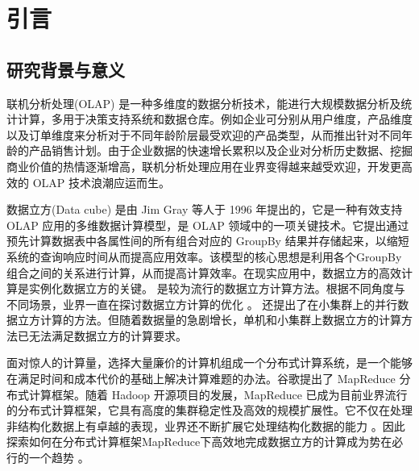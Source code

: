 \chapter{引言}

\section{研究背景与意义}
联机分析处理(OLAP) \cite{chaudhuri1997overview} 是一种多维度的数据分析技术，能进行大规模数据分析及统计计算，多用于决策支持系统和数据仓库。例如企业可分别从用户维度，产品维度以及订单维度来分析对于不同年龄阶层最受欢迎的产品类型，从而推出针对不同年龄的产品销售计划。由于企业数据的快速增长累积以及企业对分析历史数据、挖掘商业价值的热情逐渐增高，联机分析处理应用在业界变得越来越受欢迎，开发更高效的 OLAP 技术浪潮应运而生。

数据立方(Data cube) \cite{gray1997data}是由 Jim Gray 等人于 1996 年提出的，它是一种有效支持 OLAP 应用的多维数据计算模型，是 OLAP 领域中的一项关键技术。它提出通过预先计算数据表中各属性间的所有组合对应的 GroupBy 结果并存储起来，以缩短系统的查询响应时间从而提高应用效率。该模型的核心思想是利用各个GroupBy组合之间的关系进行计算，从而提高计算效率。在现实应用中，数据立方的高效计算是实例化数据立方的关键。 \cite{agarwal1996computation} \cite{beyer1999bottom} 是较为流行的数据立方计算方法。根据不同角度与不同场景，业界一直在探讨数据立方计算的优化 \cite{xin2003star} \cite{harinarayan1996implementing} \cite{zhao1997array} \cite{han2001efficient} \cite{wang2002condensed}。\cite{ng2001iceberg} \cite{dehne2002parallelizing} 还提出了在小集群上的并行数据立方计算的方法。但随着数据量的急剧增长，单机和小集群上数据立方的计算方法已无法满足数据立方的计算要求。


面对惊人的计算量，选择大量廉价的计算机组成一个分布式计算系统，是一个能够在满足时间和成本代价的基础上解决计算难题的办法。谷歌提出了 MapReduce \cite{dean2008mapreduce}分布式计算框架。随着 Hadoop \cite{hadoop}开源项目的发展，MapReduce 已成为目前业界流行的分布式计算框架，它具有高度的集群稳定性及高效的规模扩展性。它不仅在处理非结构化数据上有卓越的表现，业界还不断扩展它处理结构化数据的能力 \cite{hbase} \cite{abouzeid2009hadoopdb} \cite{buck2011scihadoop} \cite{pig} \cite{hive}。因此探索如何在分布式计算框架MapReduce下高效地完成数据立方的计算成为势在必行的一个趋势
 \cite{abello2011building} \cite{wang2010mapreducemerge} \cite{sergey2009applying} \cite{lee2012efficient} \cite{wang2013scalable}。




